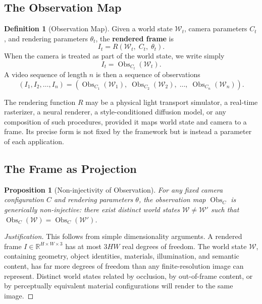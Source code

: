 \documentclass[11pt,a4paper]{article}
\theoremstyle{plain}
\newtheorem{proposition}[theorem]{Proposition}
\theoremstyle{definition}
\newtheorem{definition}[theorem]{Definition}
\theoremstyle{remark}
\DeclareMathOperator{\Obs}{Obs}
\begin{document}
\subsection{The Observation Map}

\begin{definition}[Observation Map]
Given a world state $\mathcal{W}_t$, camera parameters $C_t$, and rendering parameters $\theta_t$, the \textbf{rendered frame} is
\[
I_t = R(\mathcal{W}_t,\; C_t,\; \theta_t).
\]
When the camera is treated as part of the world state, we write simply
\[
I_t = \Obs_{C_t}(\mathcal{W}_t).
\]
A video sequence of length $n$ is then a sequence of observations
\[
(I_1, I_2, \ldots, I_n) = (\Obs_{C_1}(\mathcal{W}_1),\; \Obs_{C_2}(\mathcal{W}_2),\; \ldots,\; \Obs_{C_n}(\mathcal{W}_n)).
\]
\end{definition}

The rendering function $R$ may be a physical light transport simulator, a real-time rasterizer, a neural renderer, a style-conditioned diffusion model, or any composition of such procedures, provided it maps world state and camera to a frame. Its precise form is not fixed by the framework but is instead a parameter of each application.

\subsection{The Frame as Projection}

\begin{proposition}[Non-injectivity of Observation]
For any fixed camera configuration $C$ and rendering parameters $\theta$, the observation map $\Obs_C$ is generically non-injective: there exist distinct world states $\mathcal{W} \neq \mathcal{W}'$ such that $\Obs_C(\mathcal{W}) = \Obs_C(\mathcal{W}')$.
\end{proposition}

\begin{proof}[Justification]
This follows from simple dimensionality arguments. A rendered frame $I \in \mathbb{R}^{H \times W \times 3}$ has at most $3HW$ real degrees of freedom. The world state $\mathcal{W}$, containing geometry, object identities, materials, illumination, and semantic content, has far more degrees of freedom than any finite-resolution image can represent. Distinct world states related by occlusion, by out-of-frame content, or by perceptually equivalent material configurations will render to the same image.
\end{proof}
\end{document}

